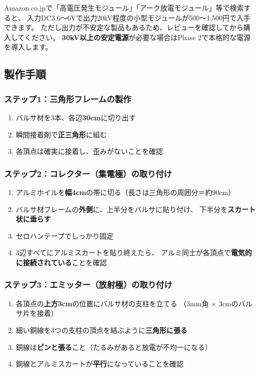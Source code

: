 \documentclass[12pt,a4paper]{ltjsarticle}
\begin{document}
\begin{warningbox}
Amazon.co.jpで「高電圧発生モジュール」「アーク放電モジュール」等で検索すると、
入力DC3.6〜6Vで出力20kV程度の小型モジュールが500〜1,500円で入手できます。
ただし出力が不安定な製品もあるため、レビューを確認してから購入してください。
\textbf{30kV以上の安定電源}が必要な場合はPhase 2で本格的な電源を導入します。
\end{warningbox}

\subsection{製作手順}

\subsubsection{ステップ1：三角形フレームの製作}

\begin{enumerate}[leftmargin=2em]
  \item バルサ材を3本、各辺\textbf{30cm}に切り出す
  \item 瞬間接着剤で\textbf{正三角形}に組む
  \item 各頂点は確実に接着し、歪みがないことを確認
\end{enumerate}

\subsubsection{ステップ2：コレクター（集電極）の取り付け}

\begin{enumerate}[leftmargin=2em]
  \item アルミホイルを\textbf{幅4cm}の帯に切る（長さは三角形の周囲分＝約90cm）
  \item バルサ材フレームの\textbf{外側}に、上半分をバルサに貼り付け、
        下半分を\textbf{スカート状に垂らす}
  \item セロハンテープでしっかり固定
  \item 3辺すべてにアルミスカートを貼り終えたら、
        アルミ同士が各頂点で\textbf{電気的に接続されている}ことを確認
\end{enumerate}

\subsubsection{ステップ3：エミッター（放射極）の取り付け}

\begin{enumerate}[leftmargin=2em]
  \item 各頂点の\textbf{上方3cm}の位置にバルサ材の支柱を立てる
        （3mm角 $\times$ 3cmのバルサ片を接着）
  \item 細い銅線を3つの支柱の頂点を結ぶように\textbf{三角形に張る}
  \item 銅線は\textbf{ピンと張る}こと（たるみがあると放電が不均一になる）
  \item 銅線とアルミスカートが\textbf{平行}になっていることを確認
\end{enumerate}
\end{document}
